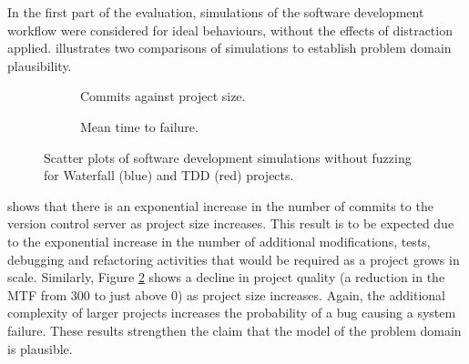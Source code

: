 \documentclass{llncs}
\begin{document}
In the first part of the evaluation, simulations of the software development workflow were considered for ideal
behaviours, without the effects of distraction applied.   illustrates two comparisons of
simulations to establish problem domain plausibility.  %
\begin{figure}[t]
  \centering

  \hfill
  \begin{subfigure}{2.3in}
    \caption{Commits against project size.}
    \label{fig:no-fuzzing:features}
  \end{subfigure}
  \hfill
  \begin{subfigure}{2.3in}
    \caption{Mean time to failure.}  
    \label{fig:no-fuzzing:mtf}
  \end{subfigure}
  \hfill

  \caption{Scatter plots of software development simulations without fuzzing for Waterfall (blue) and TDD (red)
    projects.}
  \label{fig:no-fuzzing}
\end{figure}
shows that there is an exponential increase in the number of commits to the version control server as project size
increases. This result is to be expected due to the exponential increase in the number of additional modifications,
tests, debugging and refactoring activities that would be required as a project grows in scale. Similarly, Figure
\ref{fig:no-fuzzing:mtf} shows a decline in project quality (a reduction in the MTF from 300 to just above 0) as project
size increases. Again, the additional complexity of larger projects increases the probability of a bug causing a system
failure. These results strengthen the claim that the model of the problem domain is plausible.
\end{document}
